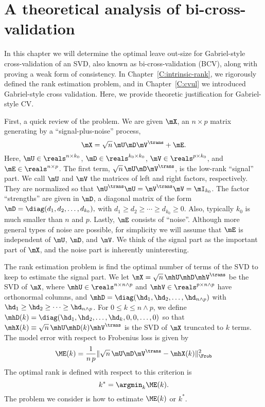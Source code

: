 \chapter[A theoretical analysis of BCV]{A theoretical analysis of bi-cross-validation}
\label{C:optimal-leave-out}

In this chapter we will determine the optimal leave out-size for Gabriel-style
cross-validation of an SVD, also known as bi-cross-validation (BCV), along
with proving a weak form of consistency.  In Chapter~\ref{C:intrinsic-rank},
we rigorously defined the rank estimation problem, and in 
Chapter~\ref{C:cvul} we introduced Gabriel-style cross validation.  Here, we 
provide theoretic justification for Gabriel-style CV.

First, a quick review of the problem.  We are given $\mX$, an $n \times p$ matrix generating by a ``signal-plus-noise'' process, 
\[
    \mX = \sqrt{n} \, \mU \mD \mV^\trans + \mE.
\]
Here, $\mU \in \reals^{n \times k_0}$, $\mD \in \reals^{k_0 \times k_0}$,
$\mV \in \reals^{p \times k_0}$, and $\mE \in \reals^{n \times p}$.  The first
term, $\sqrt{n} \, \mU \mD \mV^\trans$, is the low-rank ``signal'' part.  We call 
$\mU$ and $\mV$ the matrices of left and right factors, respectively.  They 
are normalized so that $\mU^\trans \mU = \mV^\trans \mV = \mI_{k_0}$.  The 
factor ``strengths'' are given in $\mD$, a diagonal matrix of the form
\(
    \mD =
        \diag( d_1, d_2, \ldots, d_{k_0}),
\)
with $d_1 \geq d_2 \geq \cdots \geq d_{k_0} \geq 0$.  Also, typically $k_0$ is 
much smaller than $n$ and $p$.  Lastly, $\mE$ consists of ``noise''.  Although more general types of noise are possible, for simplicity we will assume that $\mE$ is independent of $\mU$, $\mD$, and $\mV$.  We think 
of the signal part as the important part of $\mX$, and the noise part is 
inherently uninteresting.

The rank estimation problem is find the optimal number of terms of the SVD to keep to estimate the signal part.  We let 
$\mX = \sqrt{n} \, \mhU \mhD \mhV^\trans$ be the SVD of $\mX$, where 
$\mhU \in \reals^{n \times n \wedge p}$ and 
$\mhV \in \reals^{p \times n \wedge p}$ have orthonormal columns, and
\(
    \mhD = \diag(
        \hd_1, \hd_2, \ldots, \hd_{n \wedge p}
    )
\)
with $\hd_1 \geq \hd_2 \geq \cdots \geq \hd_{n \wedge p}$.  For $0 \leq k \leq n \wedge p$, we define
\(
    \mhD(k) = \diag(
        \hd_1, \hd_2, \ldots, \hd_k, 0, 0, \ldots, 0
    )
\)
so that $\mhX(k) \equiv \sqrt{n} \, \mhU \mhD(k) \mhV^\trans$ is the SVD of $\mX$ truncated to $k$ terms.  The model error with respect to Frobenius loss is given by
\[
    \ME(k) = \frac{1}{n \, p}
             \| \sqrt{n} \, \mU \mD \mV^\trans - \mhX(k) \|_\Frob^2
\]
The optimal rank is defined with respect to this criterion is
\[
    k^\ast = \argmin_k \ME(k).
\]
The problem we consider is how to estimate $\ME(k)$ or $k^\ast$.

